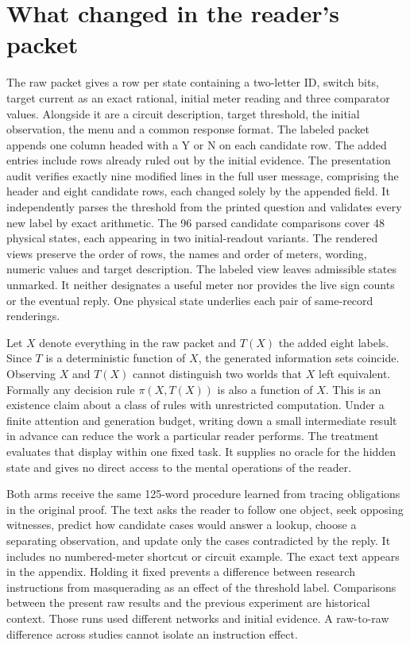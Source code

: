 \documentclass[12pt,letterpaper]{article}
\newcommand{\code}[1]{\texttt{\detokenize{#1}}}
\begin{document}
\section{What changed in the reader's packet}

The raw packet gives a row per state containing a two-letter ID, switch bits, target current as an exact rational, initial meter reading and three comparator values. Alongside it are a circuit description, target threshold, the initial observation, the menu and a common response format. The labeled packet appends one column headed \code{target_current_above_threshold} with a Y or N on each candidate row. The added entries include rows already ruled out by the initial evidence. The presentation audit verifies exactly nine modified lines in the full user message, comprising the header and eight candidate rows, each changed solely by the appended field. It independently parses the threshold from the printed question and validates every new label by exact arithmetic. The 96 parsed candidate comparisons cover 48 physical states, each appearing in two initial-readout variants. The rendered views preserve the order of rows, the names and order of meters, wording, numeric values and target description. The labeled view leaves admissible states unmarked. It neither designates a useful meter nor provides the live sign counts or the eventual reply. One physical state underlies each pair of same-record renderings.

Let $X$ denote everything in the raw packet and $T(X)$ the added eight labels. Since $T$ is a deterministic function of $X$, the generated information sets coincide. Observing $X$ and $T(X)$ cannot distinguish two worlds that $X$ left equivalent. Formally any decision rule $\pi(X,T(X))$ is also a function of $X$. This is an existence claim about a class of rules with unrestricted computation. Under a finite attention and generation budget, writing down a small intermediate result in advance can reduce the work a particular reader performs. The treatment evaluates that display within one fixed task. It supplies no oracle for the hidden state and gives no direct access to the mental operations of the reader.

Both arms receive the same 125-word procedure learned from tracing obligations in the original proof. The text asks the reader to follow one object, seek opposing witnesses, predict how candidate cases would answer a lookup, choose a separating observation, and update only the cases contradicted by the reply. It includes no numbered-meter shortcut or circuit example. The exact text appears in the appendix. Holding it fixed prevents a difference between research instructions from masquerading as an effect of the threshold label. Comparisons between the present raw results and the previous experiment are historical context. Those runs used different networks and initial evidence. A raw-to-raw difference across studies cannot isolate an instruction effect.
\end{document}
